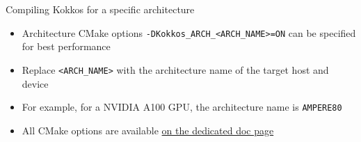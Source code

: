 \documentclass[aspectratio=169]{beamer}
\begin{document}

\begin{frame}{Compiling Kokkos for a specific architecture}
    \begin{itemize}
        \item Architecture CMake options \texttt{-DKokkos\_ARCH\_<ARCH\_NAME>=ON} can be specified for best performance
        \item Replace \texttt{<ARCH\_NAME>} with the architecture name of the target host and device
        \item For example, for a NVIDIA A100 GPU, the architecture name is \texttt{AMPERE80}
        \item All CMake options are available \href{https://kokkos.org/kokkos-core-wiki/keywords.html}{on the dedicated doc page}
    \end{itemize}
\end{frame}

\end{document}
